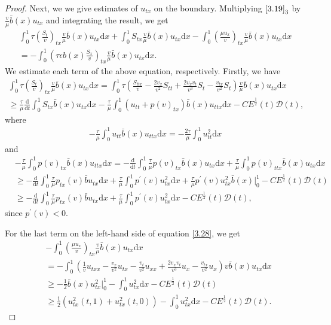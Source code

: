 \documentclass[10pt,reqno]{amsart}
\numberwithin{equation}{section}
\newcommand{\dif}{\mathrm{d}}
\begin{document}
\begin{proof}
Next, we we give estimates of $u_{tx}$ on the boundary. Multiplying  $\eqref{3.19}_3$ by $\frac{v}{\mu} \bar b(x) u_{tx}$ and integrating the result, we get
\begin{align}
\int_0^1 \tau \left(\frac{S_t}{v}\right)_{tx} \frac{v}{\mu} \bar b(x) u_{tx} \dif x+\int_0^1 S_{tx}\frac{v}{\mu}\bar b(x) u_{tx} \dif x 
-\int_0^1 \left(\frac{\mu u_x}{v}\right)_{tx} \frac{v}{\mu} \bar b(x) u_{tx} \dif x \nonumber\\
=-\int_0^1\left( \tau\epsilon b(x) \frac{S_x}{v}\right)_{tx} \frac{v}{\mu} \bar b(x) u_{tx}\dif x . \label{3.29}
\end{align}
We estimate each term of the above equation, respectively. Firstly, we have
\begin{align*}
\int_0^1 \tau\left(\frac{S_t}{v}\right)_{tx} \frac{v}{\mu} \bar b(x) u_{tx} \dif x
=\int_0^1 \tau \left(\frac{S_{ttx}}{v}-\frac{2v_x}{v^2} S_{tt}+\frac{2v_xv_t}{v^3} S_t-\frac{v_{tx}}{v^2} S_t\right)\frac{v}{\mu} \bar b(x) u_{tx}\dif x\\
\ge \frac{\tau}{\mu} \frac{\dif}{\dif t}\int_0^1 S_{tx} \bar b(x) u_{tx}\dif x -\frac{\tau}{\mu}\int_0^1 (u_{tt}+p(v)_{tx}) \bar b(x) u_{ttx}\dif x -C E^\frac{1}{2}(t) \mathcal D(t),
\end{align*}
where
\begin{align*}
-\frac{\tau}{\mu} \int_0^1 u_{tt} \bar b(x) u_{ttx}\dif x=-\frac{2\tau}{\mu}\int_0^1  u_{tt}^2\dif x
\end{align*}
and
\begin{align*}
&-\frac{\tau}{\mu} \int_0^1 p(v)_{tx} \bar b(x) u_{ttx}\dif x=-\frac{\dif}{\dif t} \int_0^1 \frac{\tau}{\mu}  p(v)_{tx}\bar b(x) u_{tx} \dif x+\frac{\tau}{\mu}\int_0^1 p(v)_{ttx} \bar b(x)u_{tx}\dif x\\
&\ge-\frac{\dif}{\dif t}\int_0^1 \frac{\tau}{\mu} p_{tx}(v) \bar b u_{tx}\dif x +\frac{\tau}{\mu} \int_0^1 p^\prime(v)u_{tx}^2\dif x +\frac{\tau}{\mu} p^\prime(v) u_{tx}^2 \bar b(x)\big|_0^1-CE^\frac{1}{2}(t)\mathcal D(t)\\
 &\ge-\frac{\dif}{\dif t}\int_0^1 \frac{\tau}{\mu} p_{tx}(v) \bar b u_{tx}\dif x +\frac{\tau}{\mu} \int_0^1 p^\prime(v)u_{tx}^2\dif x-CE^\frac{1}{2}(t)\mathcal D(t),
\end{align*} 
since $p^\prime(v)<0$. 

For the last term on the left-hand side of equation \eqref{3.28}, we get
\begin{align*}
&-\int_0^1 \left(\frac{\mu u_x}{v}\right)_{tx} \frac{v}{\mu} \bar b(x) u_{tx}\dif x\\
&=-\int_0^1\left(\frac{1}{v} u_{txx}-\frac{v_x}{v^2} u_{tx}-\frac{v_t}{v^2}u_{xx}+\frac{2v_x v_t}{v^3} u_x-\frac{v_{tx}}{v^2}u_x\right)v \bar b(x)u_{tx}\dif x\\
&\ge -\frac{1}{2}\bar b(x) u_{tx}^2 \big|_0^1-\int_0^1 u_{tx}^2\dif x-CE^\frac{1}{2}(t)\mathcal D(t)\\
&\ge \frac{1}{2} (u_{tx}^2(t,1)+u_{tx}^2(t, 0))-\int_0^1 u_{tx}^2 \dif x-CE^\frac{1}{2}(t)\mathcal D(t).
\end{align*}




\end{proof}
\end{document}
